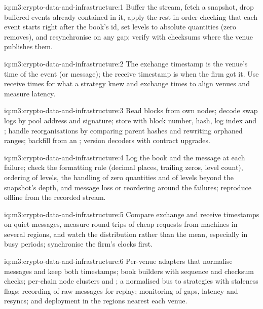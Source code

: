 \begin{solution}{iq:m3:crypto-data-and-infrastructure:1}
Buffer the stream, fetch a snapshot, drop buffered events already contained in it, apply the rest in order checking that each event starts right after the
book's id, set levels to absolute quantities (zero removes), and resynchronise on any gap; verify with checksums where the venue publishes them.
\end{solution}

\begin{solution}{iq:m3:crypto-data-and-infrastructure:2}
The exchange timestamp is the venue's time of the event (or message); the receive timestamp is when the firm got it. Use receive times for what a strategy knew
and exchange times to align venues and measure latency.
\end{solution}

\begin{solution}{iq:m3:crypto-data-and-infrastructure:3}
Read blocks from own nodes; decode swap logs by pool address and signature; store with block number, hash, log index and ; handle reorganisations by
comparing parent hashes and rewriting orphaned ranges; backfill from an ; version decoders with contract upgrades.
\end{solution}

\begin{solution}{iq:m3:crypto-data-and-infrastructure:4}
Log the book and the message at each failure; check the formatting rule (decimal places, trailing zeros, level count), ordering of levels, the handling of zero
quantities and of levels beyond the snapshot's depth, and message loss or reordering around the failures; reproduce offline from the recorded stream.
\end{solution}

\begin{solution}{iq:m3:crypto-data-and-infrastructure:5}
Compare exchange and receive timestamps on quiet messages, measure round trips of cheap requests from machines in several regions, and watch the distribution rather
than the mean, especially in busy periods; synchronise the firm's clocks first.
\end{solution}

\begin{solution}{iq:m3:crypto-data-and-infrastructure:6}
Per-venue adapters that normalise messages and keep both timestamps; book builders with sequence and checksum checks; per-chain node clusters and ; a
normalised bus to strategies with staleness flags; recording of raw messages for replay; monitoring of gaps, latency and resyncs; and deployment in the regions
nearest each venue.
\end{solution}

